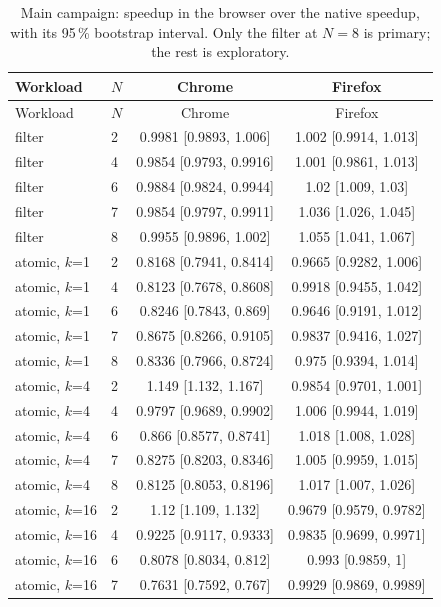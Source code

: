 {\small
\begin{longtable}{llcc}
\caption{Main campaign: speedup in the browser over the native speedup, with its 95\,\% bootstrap interval. Only the filter at $N=8$ is primary; the rest is exploratory.}\label{tab:rq1-ratios} \\
\toprule
Workload & $N$ & Chrome & Firefox \\
\midrule
\endfirsthead
\toprule
Workload & $N$ & Chrome & Firefox \\
\midrule
\endhead
\bottomrule
\endfoot
filter & 2 & 0.9981 [0.9893, 1.006] & 1.002 [0.9914, 1.013] \\
filter & 4 & 0.9854 [0.9793, 0.9916] & 1.001 [0.9861, 1.013] \\
filter & 6 & 0.9884 [0.9824, 0.9944] & 1.02 [1.009, 1.03] \\
filter & 7 & 0.9854 [0.9797, 0.9911] & 1.036 [1.026, 1.045] \\
filter & 8 & 0.9955 [0.9896, 1.002] & 1.055 [1.041, 1.067] \\
\midrule
atomic, $k$=1 & 2 & 0.8168 [0.7941, 0.8414] & 0.9665 [0.9282, 1.006] \\
atomic, $k$=1 & 4 & 0.8123 [0.7678, 0.8608] & 0.9918 [0.9455, 1.042] \\
atomic, $k$=1 & 6 & 0.8246 [0.7843, 0.869] & 0.9646 [0.9191, 1.012] \\
atomic, $k$=1 & 7 & 0.8675 [0.8266, 0.9105] & 0.9837 [0.9416, 1.027] \\
atomic, $k$=1 & 8 & 0.8336 [0.7966, 0.8724] & 0.975 [0.9394, 1.014] \\
\midrule
atomic, $k$=4 & 2 & 1.149 [1.132, 1.167] & 0.9854 [0.9701, 1.001] \\
atomic, $k$=4 & 4 & 0.9797 [0.9689, 0.9902] & 1.006 [0.9944, 1.019] \\
atomic, $k$=4 & 6 & 0.866 [0.8577, 0.8741] & 1.018 [1.008, 1.028] \\
atomic, $k$=4 & 7 & 0.8275 [0.8203, 0.8346] & 1.005 [0.9959, 1.015] \\
atomic, $k$=4 & 8 & 0.8125 [0.8053, 0.8196] & 1.017 [1.007, 1.026] \\
\midrule
atomic, $k$=16 & 2 & 1.12 [1.109, 1.132] & 0.9679 [0.9579, 0.9782] \\
atomic, $k$=16 & 4 & 0.9225 [0.9117, 0.9333] & 0.9835 [0.9699, 0.9971] \\
atomic, $k$=16 & 6 & 0.8078 [0.8034, 0.812] & 0.993 [0.9859, 1] \\
atomic, $k$=16 & 7 & 0.7631 [0.7592, 0.767] & 0.9929 [0.9869, 0.9989] \\

\end{longtable}}
